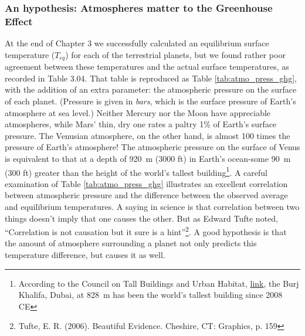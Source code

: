 \documentclass[amstex,12pt]{book}
\begin{document}
\subsubsection{An hypothesis: Atmospheres matter to the Greenhouse Effect} 
At the end of Chapter 3 we successfully calculated an equilibrium surface temperature ($T_{eq}$) for each of the terrestrial planets, but we found rather poor agreement between these temperatures and the actual surface temperatures, as recorded in Table 3.04. That table is reproduced as Table \ref{tab:atmo_press_ghg}, with the addition of an extra parameter: the atmospheric pressure on the surface of each planet. (Pressure is given in \textit{bars}, which is the surface pressure of Earth's atmosphere at sea level.) Neither Mercury nor the Moon have appreciable atmospheres, while Mars' thin, dry one rates a paltry 1\% of Earth's surface pressure. The Venusian atmosphere, on the other hand, is almost 100 times the pressure of Earth’s atmosphere! The atmospheric pressure on the surface of Venus is equivalent to that at a depth of \SI{920}{\metre} (3000 ft) in Earth's ocean-some \SI{90}{\metre} (300 ft) greater than the height of the world's tallest building\footnote{According to the Council on Tall Buildings and Urban Habitat, \href{http://www.skyscrapercenter.com/}{link}, the Burj Khalifa, Dubai, at \SI{828}{\metre} has been the world's tallest building since 2008 CE}. A careful examination of Table \ref{tab:atmo_press_ghg} illustrates an excellent correlation between atmospheric pressure and the difference between the observed average and equilibrium temperatures. A saying in science is that correlation between two things doesn't imply that one causes the other. But as Edward Tufte noted, ``Correlation is not causation but it sure is a hint''\footnote{Tufte, E. R. (2006). Beautiful Evidence. Cheshire, CT: Graphics, p. 159}. A good hypothesis is that the amount of atmosphere surrounding a planet not only predicts this temperature difference, but causes it as well.\\
\end{document}
